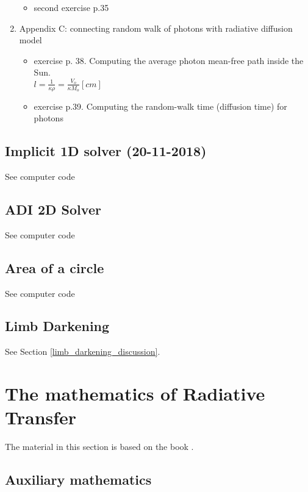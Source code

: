 \documentclass[../main/main.tex]{subfiles}
\begin{document}
\begin{enumerate}
\begin{itemize}
\begin{itemize}
\end{itemize}

\item second exercise p.35
\end{itemize}

\item Appendix C: connecting random walk of photons with radiative diffusion model
\begin{itemize}
\item exercise p. 38. Computing the average photon mean-free path inside the Sun. \\
$l = \frac{1}{\kappa \rho} = \frac{V_o}{\kappa M_o} [cm]$

\item exercise p.39. Computing the random-walk time (diffusion time) for photons

\end{itemize}


\end{enumerate}

\subsection{Implicit 1D solver (20-11-2018)}
See computer code
\subsection{ADI 2D Solver}
See computer code
\subsection{Area of a circle}
See computer code
\subsection{Limb Darkening}
See Section \ref{limb_darkening_discussion}.


\newpage
\section{The mathematics of Radiative Transfer}
The material in this section is based on the book \cite{Busbridge}.

\subsection{Auxiliary mathematics}
\end{document}
